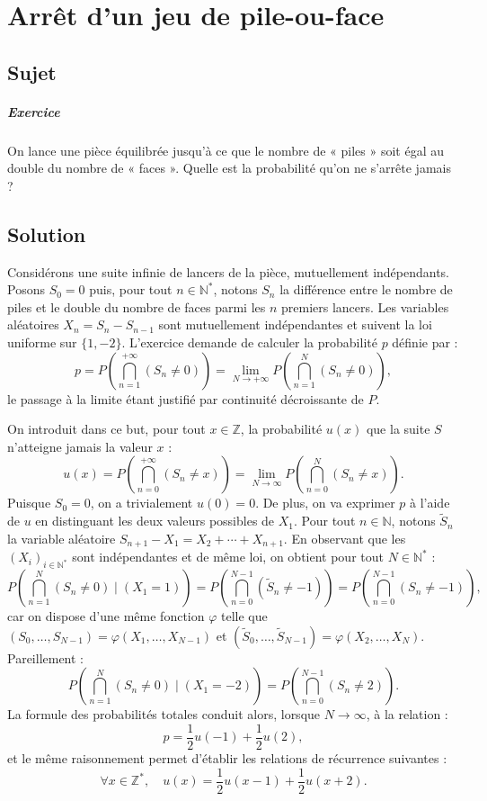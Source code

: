 \chapter{Arrêt d'un jeu de pile-ou-face}

\section{Sujet}

\paragraph{Exercice}

On lance une pièce équilibrée jusqu'à ce que le nombre de « piles » soit égal au double du nombre de « faces ». Quelle est la probabilité qu'on ne s'arrête jamais ?

\section{Solution}

Considérons une suite infinie de lancers de la pièce, mutuellement indépendants. Posons $S_0 = 0$ puis, pour tout $n \in \mathbb N^*$, notons $S_n$ la différence entre le nombre de piles et le double du nombre de faces parmi les $n$ premiers lancers. Les variables aléatoires $X_n = S_n - S_{n-1}$ sont mutuellement indépendantes et suivent la loi uniforme sur $\{1,-2\}$. L'exercice demande de calculer la probabilité $p$ définie par :
\[
p = P\left(\bigcap_{n=1}^{+\infty} (S_n \neq 0)\right) = \lim_{N\to+\infty} P\left(\bigcap_{n=1}^N (S_n \neq 0)\right),
\]
le passage à la limite étant justifié par continuité décroissante de $P$.

On introduit dans ce but, pour tout $x \in \mathbb Z$, la probabilité $u(x)$ que la suite $S$ n'atteigne jamais la valeur $x$ :
\[
u(x) = P\left(\bigcap_{n=0}^{+\infty} (S_n \neq x)\right) = \lim_{N\to\infty} P\left(\bigcap_{n=0}^N (S_n \neq x)\right).
\]
Puisque $S_0=0$, on a trivialement $u(0) = 0$. De plus, on va exprimer $p$ à l'aide de $u$ en distinguant les deux valeurs possibles de $X_1$. Pour tout $n \in \mathbb N$, notons $\tilde S_n$ la variable aléatoire $S_{n+1} - X_1 = X_2 + \cdots + X_{n+1}$. En observant que les $(X_i)_{i\in\mathbb N^*}$ sont indépendantes et de même loi, on obtient pour tout $N \in \mathbb N^*$ :
\[
P\left(\bigcap_{n=1}^N (S_n \neq 0)\mid (X_1 = 1)\right) = P\left(\bigcap_{n=0}^{N-1} (\tilde S_n \neq -1)\right) = P\left(\bigcap_{n=0}^{N-1} (S_n \neq -1)\right),
\]
car on dispose d'une même fonction $\varphi$ telle que $(S_0,\dots,S_{N-1}) = \varphi(X_1,\dots,X_{N-1})$ et $(\tilde S_0,\dots,\tilde S_{N-1}) = \varphi(X_2,\dots,X_N)$. 
Pareillement :
\[
P\left(\bigcap_{n=1}^N (S_n \neq 0)\mid (X_1 = -2)\right) = P\left(\bigcap_{n=0}^{N-1} (S_n \neq 2)\right).
\]
La formule des probabilités totales conduit alors, lorsque $N \to \infty$, à la relation :
\[
p= \frac12 u(-1) + \frac12 u(2),
\]
et le même raisonnement permet d'établir les relations de récurrence suivantes :
\[
\forall x \in \mathbb Z^*,\quad
u(x) = \frac12 u(x-1) + \frac12 u(x+2).
\]


